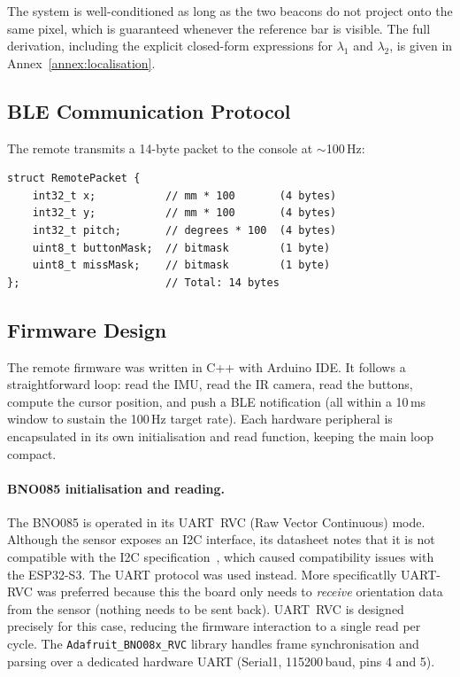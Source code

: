\documentclass[12pt, a4paper]{article}
\begin{document}
The system is well-conditioned as long as the two beacons do not project onto
the same pixel, which is guaranteed whenever the reference bar is visible.
The full derivation, including the explicit closed-form expressions for
$\lambda_1$ and $\lambda_2$, is given in Annex~\ref{annex:localisation}.
\subsection{BLE Communication Protocol}

The remote transmits a 14-byte packet to the console at $\sim$100\,Hz:

\begin{lstlisting}[caption={BLE packet structure (remote $\to$ PC)}, label={lst:packet}]
struct RemotePacket {
    int32_t x;           // mm * 100       (4 bytes)
    int32_t y;           // mm * 100       (4 bytes)
    int32_t pitch;       // degrees * 100  (4 bytes)
    uint8_t buttonMask;  // bitmask        (1 byte)
    uint8_t missMask;    // bitmask        (1 byte)
};                       // Total: 14 bytes
\end{lstlisting}


\subsection{Firmware Design}

The remote firmware was written in C++ with Arduino IDE. It follows a straightforward loop: read the IMU, read the IR camera, read the buttons, compute the cursor position, and push a BLE notification (all within a 10\,ms window to sustain the 100\,Hz target rate). Each hardware peripheral is encapsulated in its own initialisation and read function, keeping the main loop compact.

\paragraph{BNO085 initialisation and reading.}
The BNO085 is operated in its UART~RVC (Raw Vector Continuous) mode. Although the sensor exposes an I2C interface, its datasheet notes that it is not compatible with the I2C specification~\cite{bno085}, which caused compatibility issues with the ESP32-S3. The UART protocol was used instead. More specificatlly UART-RVC was preferred because this the board only needs to \textit{receive} orientation data from the sensor (nothing needs to be sent back). UART~RVC is designed precisely for this case, reducing the firmware interaction to a single read per cycle. The \texttt{Adafruit\_BNO08x\_RVC} library handles frame synchronisation and parsing over a dedicated hardware UART (Serial1, 115200\,baud, pins 4 and 5).
\end{document}
